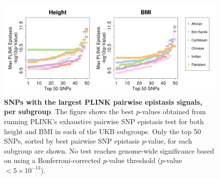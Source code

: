 \documentclass[12pt,a4paper]{article}
\begin{document}
\begin{figure}[htbp]
\centering
\hspace*{-1.7cm}
\includegraphics[scale=.45]{Images/Supp/InterPath_Supp_Figure_PLINK_BestSNPs_vs2_AllPops_HeightBMI.png}
\caption[TBD]{\textbf{SNPs with the largest PLINK pairwise epistasis signals, per subgroup}. The figure shows the best $p$-values obtained from running PLINK's exhaustive pairwise SNP epistasis test for both height and BMI in each of the UKB subgroups. Only the top 50 SNPs, sorted by best pairwise SNP epistasis $p$-value, for each subgroup are shown. No test reaches genome-wide significance based on using a Bonferroni-corrected $p$-value threshold ($p$-value $< 5\times10^{-13}$).}
\label{InterPath-Supp-Figure-PLINK-HeightBMI-AllPops}
\end{figure}
\clearpage

\end{document}
